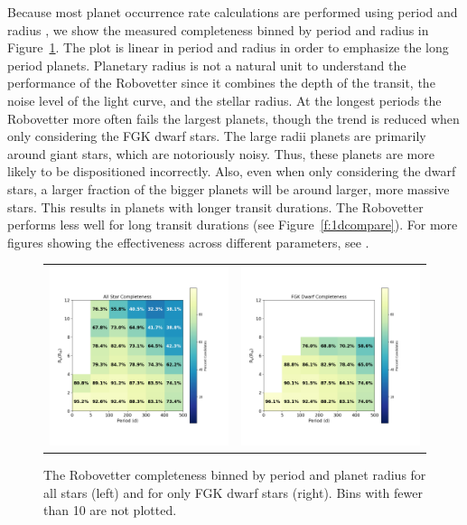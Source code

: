Because most planet occurrence rate calculations are performed using period and radius \citep[e.g.,][]{Burke2015}, we show the measured completeness binned by period and radius in Figure~\ref{f:prCompleteness}. The plot is linear in period and radius in order to emphasize the long period planets. Planetary radius is not a natural unit to understand the performance of the Robovetter since it combines the depth of the transit, the noise level of the light curve, and the stellar radius.  At the longest periods the Robovetter more often fails the largest planets, though the trend is reduced when only considering the FGK dwarf stars. The large radii planets are primarily around giant stars, which are notoriously noisy. Thus, these planets are more likely to be dispositioned incorrectly. Also, even when only considering the dwarf stars, a larger fraction of the bigger planets will be around larger, more massive stars. This results in planets with longer transit durations. The Robovetter performs less well for long transit durations (see Figure~\ref{f:1dcompare}). For more figures showing the effectiveness across different parameters, see \citet{Coughlin2017a}.


\begin{figure}[htb]
\begin{center}
\begin{tabular}{cc}
\includegraphics[width=0.48\linewidth]{fig-AllCompletePR.png} &
\includegraphics[width=0.48\linewidth]{fig-FgkCompletePR.png}
\end{tabular}
\caption{The Robovetter completeness binned by period and planet radius for all stars (left) and for only FGK dwarf stars (right). Bins with fewer than 10  are not plotted.}
\label{f:prCompleteness}
\end{center}
\end{figure}


